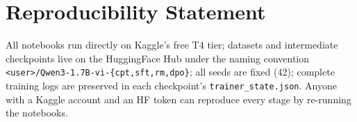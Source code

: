 \documentclass[10pt,twocolumn]{article}
\begin{document}
\section{Reproducibility Statement}

All notebooks run directly on Kaggle's free T4 tier; datasets and intermediate checkpoints live on the HuggingFace Hub under the naming convention \texttt{<user>/Qwen3-1.7B-vi-\{cpt,sft,rm,dpo\}}; all seeds are fixed (42); complete training logs are preserved in each checkpoint's \texttt{trainer\_state.json}. Anyone with a Kaggle account and an HF token can reproduce every stage by re-running the notebooks.



\end{document}
